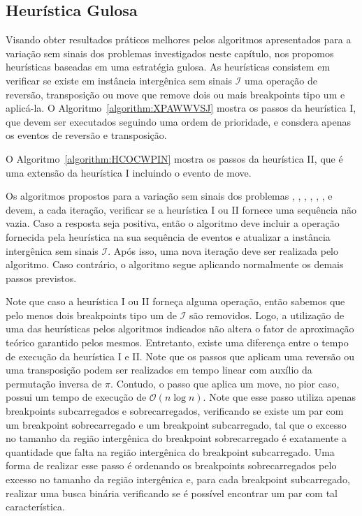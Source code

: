 \subsection{Heurística Gulosa}

Visando obter resultados práticos melhores pelos algoritmos apresentados para a variação sem sinais dos problemas investigados neste capítulo, nos propomos heurísticas baseadas em uma estratégia gulosa. As heurísticas consistem em verificar se existe em instância intergênica sem sinais $\mathcal{I}$ uma operação de reversão, transposição ou move que remove dois ou mais breakpoints tipo um e aplicá-la. O Algoritmo~\ref{algorithm:XPAWWVSJ} mostra os passos da heurística I, que devem ser executados seguindo uma ordem de prioridade, e consdera apenas os eventos de reversão e transposição.  



O Algoritmo~\ref{algorithm:HCOCWPIN} mostra os passos da heurística II, que é uma extensão da heurística I incluindo o evento de move.  



Os algoritmos propostos para a variação sem sinais dos problemas \SbIR{}, \SbIRI{}, \SbIRM{}, \SbIRMI{}, \SbIRT{}, \SbIRTI{}, \SbIRTM{} e \SbIRTMI{} devem, a cada iteração, verificar se a heurística I ou II fornece uma sequência não vazia. Caso a resposta seja positiva, então o algoritmo deve incluir a operação fornecida pela heurística na sua sequência de eventos e atualizar a instância intergênica sem sinais $\mathcal{I}$. Após isso, uma nova iteração deve ser realizada pelo algoritmo. Caso contrário, o algoritmo segue aplicando normalmente os demais passos previstos.

Note que caso a heurística I ou II forneça alguma operação, então sabemos que pelo menos dois breakpoints tipo um de $\mathcal{I}$ são removidos. Logo, a utilização de uma das heurísticas pelos algoritmos indicados não altera o fator de aproximação teórico garantido pelos mesmos. Entretanto, existe uma diferença entre o tempo de execução da heurística I e II. Note que os passos que aplicam uma reversão ou uma transposição podem ser realizados em tempo linear com auxílio da permutação inversa de $\pi$. Contudo, o passo que aplica um move, no pior caso, possui um tempo de execução de $\mathcal{O}(n\log n)$. Note que esse passo utiliza apenas breakpoints subcarregados e sobrecarregados, verificando se existe um par com um breakpoint sobrecarregado e um breakpoint subcarregado, tal que o excesso no tamanho da região intergênica do breakpoint sobrecarregado é exatamente a quantidade que falta na região intergênica do breakpoint subcarregado. Uma forma de realizar esse passo é ordenando os breakpoints sobrecarregados pelo excesso no tamanho da região intergênica e, para cada breakpoint subcarregado, realizar uma busca binária verificando se é possível encontrar um par com tal característica.

